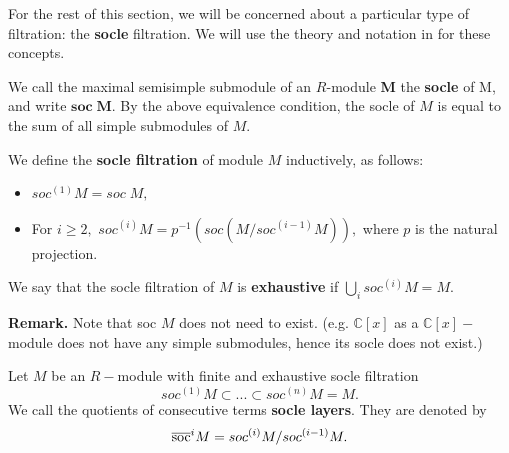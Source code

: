 \documentclass[main.tex]{subfiles}
\begin{document}
\bigskip

For the rest of this section, we will be concerned about a particular type of filtration: the \textbf{socle} filtration. We will use the theory and notation in \cite{penkov2007tensorrepresentationsclassicallocally} for these concepts.
\bigskip

\begin{defn}
    We call the maximal semisimple submodule of an $R$-module \textbf{M} the \textbf{socle} of M, and write $\mathbf{soc\;M}$. By the above equivalence condition, the socle of $M$ is equal to the sum of all simple submodules of $M.$
\end{defn}

\begin{defn}
    We define the \textbf{socle filtration} of module $M$ inductively, as follows:
    \begin{itemize}
        \item $soc^{(1)}M = soc\;M,$
        \item For $i\geq 2,$ $soc^{(i)}M = p^{-1}(soc(M/ soc^{(i-1)}M)),$ where $p$ is the natural projection.
    \end{itemize}
    We say that the socle filtration of $M$ is \textbf{exhaustive} if $\bigcup_i soc^{(i)}M = M.$

\end{defn}

\textbf{Remark.} Note that soc $M$ does not need to exist. (e.g. $\mathbb{C}[x]$ as a $\mathbb{C}[x]-$module does not have any simple submodules, hence its socle does not exist.) 

\bigskip
\begin{defn}
Let $M$ be an $R-$module with finite and exhaustive socle filtration
 $$soc^{(1)}M \subset ... \subset soc^{(n)}M = M. $$ 
 We call the quotients of consecutive terms \textbf{socle layers}. They are denoted by $$\overline{\text{soc}}^{i}M = soc^{(i)}M / soc^{(i-1)}M.$$
\end{defn}
\bigskip
\end{document}
